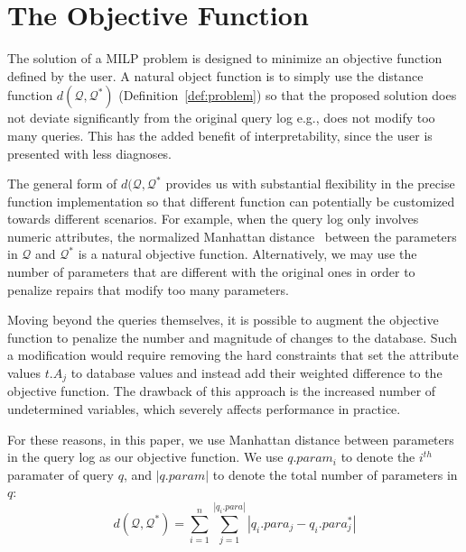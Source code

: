 \section{The Objective Function}

The solution of a MILP problem is designed to minimize an objective function defined by the user.
A natural object function is to simply use the distance function $d(\mathcal{Q}, \mathcal{Q}^*)$ 
(Definition~\ref{def:problem}) so that the proposed solution
does not deviate significantly from the original query log e.g., does not modify too many queries.  
This has the added benefit of interpretability, since the user is presented with less diagnoses.

The general form of $d(\mathcal{Q}, \mathcal{Q}^*$ provides us with substantial flexibility in the precise
function implementation so that different function can potentially be customized towards different scenarios.
For example, when the query log only involves numeric attributes, 
the normalized Manhattan distance~\cite{manhattan} between the parameters 
in $\mathcal{Q}$ and $\mathcal{Q}^*$ is a natural objective function.
Alternatively, we may use the number of parameters that are different with the original ones 
in order to penalize repairs that modify too many parameters. 

Moving beyond the queries themselves,  it is possible to augment the objective function 
to penalize the number and magnitude of changes to the database.
Such a modification would require removing the hard constraints that set the
attribute values $t.A_j$ to database values and instead add their weighted difference
to the objective function.  The drawback of this approach is the increased number of
undetermined variables, which severely affects performance in practice.

For these reasons, in this paper, we use Manhattan distance between parameters 
in the query log as our objective function.  We use $q.param_i$ to denote the $i^{th}$ paramater of query $q$,
and $|q.param|$ to denote the total number of parameters in $q$:
\[d(\mathcal{Q}, \mathcal{Q}^*) = \sum_{i = 1} ^{n} \sum_{j = 1}^{|q_i.para|} |q_i.para_j - q_i.para_j^*|\]

% 
% 
% 
